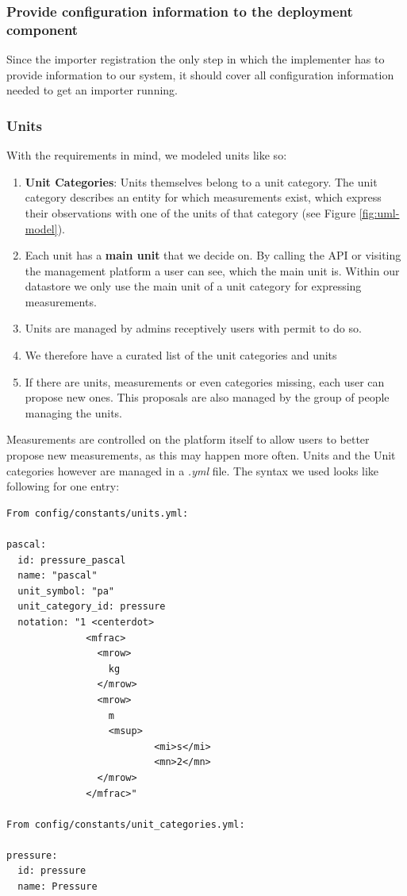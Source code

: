\subsubsection{Provide configuration information to the deployment
component}\label{provide-configuration-information-to-the-deployment-component}

Since the importer registration the only step in which the implementer
has to provide information to our system, it should cover all
configuration information needed to get an importer running.

\subsubsection{Units}\label{units}

With the requirements in mind, we modeled units like so:

\begin{enumerate}
\def\labelenumi{\arabic{enumi}.}
\tightlist
\item
  \textbf{Unit Categories}: Units themselves belong to a unit category.
  The unit category describes an entity for which measurements exist,
  which express their observations with one of the units of that
  category (see Figure \ref{fig:uml-model}).
\item
  Each unit has a \textbf{main unit} that we decide on. By calling the
  API or visiting the management platform a user can see, which the main
  unit is. Within our datastore we only use the main unit of a unit
  category for expressing measurements.
\item
  Units are managed by admins receptively users with permit to do so.
\item
  We therefore have a curated list of the unit categories and units
\item
  If there are units, measurements or even categories missing, each user
  can propose new ones. This proposals are also managed by the group of
  people managing the units.
\end{enumerate}

Measurements are controlled on the platform itself to allow users to
better propose new measurements, as this may happen more often. Units
and the Unit categories however are managed in a \emph{.yml} file. The
syntax we used looks like following for one entry:

\begin{verbatim}
From config/constants/units.yml:

pascal:
  id: pressure_pascal
  name: "pascal"
  unit_symbol: "pa"
  unit_category_id: pressure
  notation: "1 <centerdot>
              <mfrac>
                <mrow>
                  kg
                </mrow>
                <mrow>
                  m
                  <msup>
                          <mi>s</mi>
                          <mn>2</mn>
                </mrow>
              </mfrac>"

From config/constants/unit_categories.yml:

pressure:
  id: pressure
  name: Pressure
\end{verbatim}

